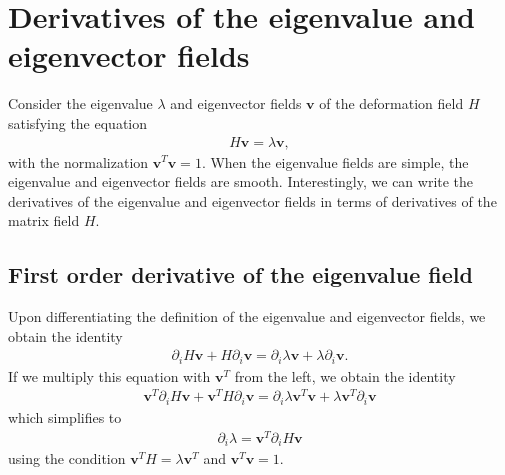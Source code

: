 \documentclass{article}
\begin{document}
\section{Derivatives of the eigenvalue and eigenvector fields}
Consider the eigenvalue $\lambda$ and eigenvector fields $\bm{v}$ of the deformation field $H$ satisfying the equation
\begin{align}
H \bm{v} = \lambda \bm{v},
\end{align}
with the normalization $\bm{v}^T\bm{v}=1$. When the eigenvalue fields are simple, the eigenvalue and eigenvector fields are smooth. Interestingly, we can write the derivatives of the eigenvalue and eigenvector fields in terms of derivatives of the matrix field $H$.

\subsection{First order derivative of the eigenvalue field}
Upon differentiating the definition of the eigenvalue and eigenvector fields, we obtain the identity 
\begin{align}
\partial_i H \bm{v} + H \partial_i \bm{v} = \partial_i \lambda \bm{v} + \lambda \partial_i \bm{v}.
\end{align}
If we multiply this equation with $\bm{v}^T$ from the left, we obtain the identity
\begin{align}
\bm{v}^T\partial_i H \bm{v} + \bm{v}^TH \partial_i \bm{v} = \partial_i \lambda \bm{v}^T\bm{v} + \lambda \bm{v}^T \partial_i \bm{v}
\end{align}
which simplifies to
\begin{align}
\partial_i \lambda = \bm{v}^T\partial_i H \bm{v} 
\end{align}
using the condition $\bm{v}^T H = \lambda \bm{v}^T$ and $\bm{v}^T\bm{v}=1$.


\end{document}
